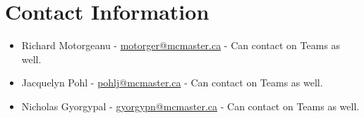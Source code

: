 \documentclass[11pt, letterpaper, notitlepage]{article}
\begin{document}
\section[3]{Contact Information}

\begin{itemize}
\item Richard Motorgeanu - \href{motorger@mcmaster.ca}{motorger@mcmaster.ca} - Can contact on Teams as well.
\item Jacquelyn Pohl - \href{pohlj@mcmaster.ca}{pohlj@mcmaster.ca} - Can contact on Teams as well.
\item Nicholas Gyorgypal - \href{gyorgypn@mcmaster.ca}{gyorgypn@mcmaster.ca} - Can contact on Teams as well.
\end{itemize}
\end{document}
